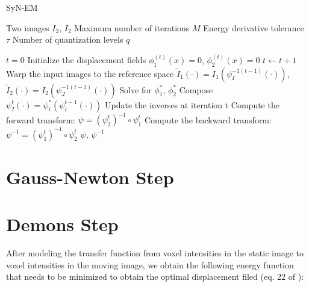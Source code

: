 \begin{algorithm}[h!]
\caption{SyN-EM}\label{alg:SyNEM}
\begin{algorithmic}[1]
\REQUIRE Two images $I_{2}$, $I_{2}$
\REQUIRE Maximum number of iterations $M$
\REQUIRE Energy derivative tolerance $\tau$
\REQUIRE Number of quantization levels $q$

\medskip
\STATE $t = 0$
\STATE Initialize the displacement fields $\phi_{1}^{(t)}(x) = 0$, $\phi_{2}^{(t)}(x) = 0$
\REPEAT
    \STATE $t \leftarrow t+1$
    \STATE Warp the input images to the reference space $\tilde{I}_{1}(\cdot) = I_{1}(\psi_{I}^{-1(t-1)}(\cdot))$, $\tilde{I}_{2}(\cdot) = I_{2}(\psi_{J}^{-1(t-1)}(\cdot))$
    \STATE Solve for $\phi_{1}^{*}$, $\phi_{2}^{*}$
    \STATE Compose $\psi_{I}^{t}(\cdot) = \psi_{i}^{*}(\psi_{i}^{t-1}(\cdot))$
    \STATE Update the inverses at iteration t
\STATE Compute the forward transform: $\psi = (\psi_{2}^{t})^{-1} \circ \psi_{1}^{t}$
\STATE Compute the backward transform: $\psi^{-1} = (\psi_{1}^{t})^{-1} \circ \psi_{2}^{t}$
\RETURN $\psi$, $\psi^{-1}$
\end{algorithmic}
\end{algorithm}


\section{Gauss-Newton Step}

\section{Demons Step}
After modeling the transfer function from voxel intensities in the static image to voxel intensities in the moving image, we obtain the following energy function that needs to be minimized to obtain the optimal displacement filed (eq. 22 of \cite{Arce-santana2014}):
